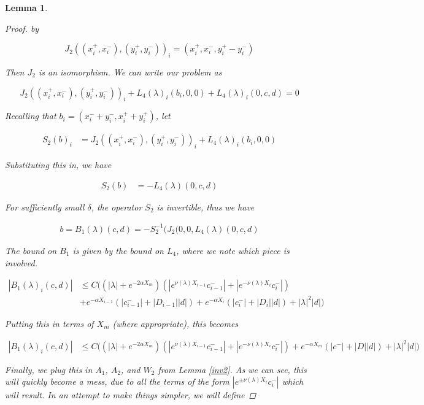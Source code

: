 \documentclass[12pt]{article}
\newtheorem{lemma}{Lemma}
\begin{document}
\begin{lemma}
\begin{proof}
by 

\[
J_2( (x_i^+, x_i^-),(y_i^+, y_i^-))_i = ( x_i^+, x_i^-, y_i^+ - y_i^- )
\]

Then $J_2$ is an isomorphism. We can write our problem as 

\[
J_2( (x_i^+, x_i^-),(y_i^+, y_i^-))_i 
+ L_4(\lambda)_i(b_i, 0, 0) + L_4(\lambda)_i(0, c, d) = 0
\]

Recalling that $b_i = (x_i^- + y_i^-, x_i^+ + y_i^+)$, let

\begin{align*}
S_2(b)_i &= J_2( (x_i^+, x_i^-),(y_i^+, y_i^-))_i 
+ L_4(\lambda)_i(b_i, 0, 0) 
\end{align*}

Substituting this in, we have

\begin{align*}
S_2(b) &= -L_4(\lambda)(0, c, d)
\end{align*}

For sufficiently small $\delta$, the operator $S_2$ is invertible, thus we have

\begin{align}
b = B_1(\lambda)(c,d) 
= -S_2^{-1} ( J_2(0, 0, L_4(\lambda)(0, c, d)
\end{align}

The bound on $B_1$ is given by the bound on $L_4$, where we note which piece is involved.

\begin{align*}
|B_1(\lambda)_i(c, d)| &\leq C \Big( 
(|\lambda| + e^{-2 \alpha X_m})( |e^{\nu(\lambda)X_{i-1}} c_{i-1}^-| + |e^{-\nu(\lambda)X_i} c_i^-|) \\
&+ e^{-\alpha X_{i-1}}( |c_{i-1}^-| + |D_{i-1}||d| ) 
+ e^{-\alpha X_i}( |c_i^-| + |D_i||d| ) 
+ |\lambda|^2 |d| \Big)
\end{align*}

Putting this in terms of $X_m$ (where appropriate), this becomes

\begin{align*}
|B_1(\lambda)_i(c, d)| &\leq C \Big( (|\lambda| + e^{-2 \alpha X_m})( |e^{\nu(\lambda)X_{i-1}} c_{i-1}^-| + |e^{-\nu(\lambda)X_i} c_i^-|)
+ e^{-\alpha X_m} ( |c^-| + |D||d| )
+ |\lambda|^2 |d| \Big)
\end{align*}

Finally, we plug this in $A_1$, $A_2$, and $W_2$ from Lemma \ref{inv2}. As we can see, this will quickly become a mess, due to all the terms of the form $|e^{\pm \nu(\lambda)X_i} c_i^-|$ which will result. In an attempt to make things simpler, we will define


\end{proof}
\end{lemma}
\end{document}
